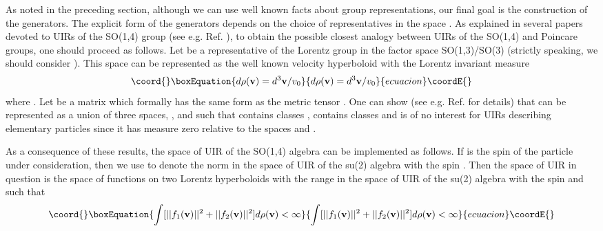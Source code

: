 \documentclass[a4paper,12pt]{article}%
\begin{document}
As noted in the preceding section, although we
can use well known facts about group representations,
our final goal is the construction of the
generators. The explicit form of the generators \coordHE{}
depends on the choice of representatives in
the space \coordHE{}. As explained in several
papers devoted to UIRs of the SO(1,4) group
(see e.g. Ref. \cite{Men}), to obtain
the  possible closest analogy between UIRs of
the SO(1,4) and Poincare groups, one should proceed
as follows. Let \coordHE{} be a representative 
of the Lorentz group in the factor space SO(1,3)/SO(3)
(strictly speaking, we should consider \coordHE{}).
This space can be represented as the well known velocity
hyperboloid with the Lorentz invariant measure
\begin{equation}\coord{}\boxEquation{
d\rho({\bf v})=d^3{\bf v}/v_0
\label{7}
}{
d\rho({\bf v})=d^3{\bf v}/v_0
}{ecuacion}\coordE{}\end{equation}
where \coordHE{}. Let \coordHE{} be a
matrix which formally has the same form as
the metric tensor \myHighlight{$\eta$}\coordHE{}. One can show 
(see e.g. Ref. \cite{Men} for details) that 
\coordHE{} can be represented as a union of three
spaces, \coordHE{}, \coordHE{} and \coordHE{} such that 
\coordHE{} contains classes \coordHE{}, \coordHE{}
contains classes \coordHE{} and \coordHE{} is of
no interest for UIRs describing elementary particles 
since it has measure zero relative to the spaces
\coordHE{} and \coordHE{}.

As a consequence of these results, the space of UIR
of the SO(1,4) algebra can be implemented as follows.  
If \coordHE{} is the spin of the particle under 
consideration, then we
use \coordHE{} to denote the norm in the space of 
UIR of the su(2) algebra with the spin \coordHE{}. 
Then the space of UIR in question is the space of 
functions \coordHE{} on
two Lorentz hyperboloids with the range in the space of
UIR of the su(2) algebra with the spin \coordHE{} and such that
\begin{equation}\coord{}\boxEquation{
\int\nolimits [||f_1({\bf v})||^2+
||f_2({\bf v})||^2]d\rho({\bf v}) <\infty
\label{8}
}{
\int\nolimits [||f_1({\bf v})||^2+
||f_2({\bf v})||^2]d\rho({\bf v}) <\infty
}{ecuacion}\coordE{}\end{equation}
\end{document}
